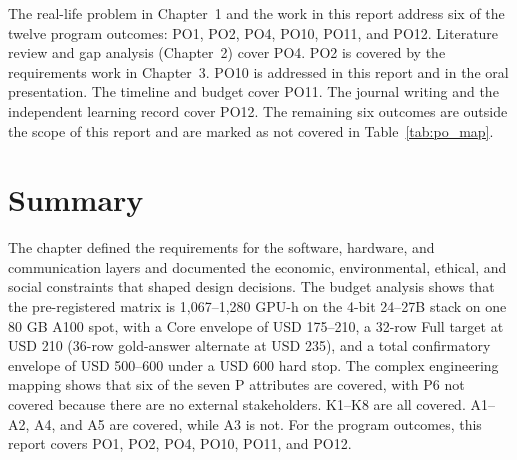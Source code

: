 The real-life problem in Chapter~1 and the work in this report address six of the twelve program outcomes: PO1, PO2, PO4, PO10, PO11, and PO12. Literature review and gap analysis (Chapter~2) cover PO4. PO2 is covered by the requirements work in Chapter~3. PO10 is addressed in this report and in the oral presentation. The timeline and budget cover PO11. The journal writing and the independent learning record cover PO12. The remaining six outcomes are outside the scope of this report and are marked as not covered in Table~\ref{tab:po_map}.

\section{Summary}
The chapter defined the requirements for the software, hardware, and communication layers and documented the economic, environmental, ethical, and social constraints that shaped design decisions. The budget analysis shows that the pre-registered matrix is 1,067--1,280 GPU-h on the 4-bit 24--27B stack on one 80 GB A100 spot, with a Core envelope of USD 175--210, a 32-row Full target at USD 210 (36-row gold-answer alternate at USD 235), and a total confirmatory envelope of USD 500--600 under a USD 600 hard stop. The complex engineering mapping shows that six of the seven P attributes are covered, with P6 not covered because there are no external stakeholders. K1--K8 are all covered. A1--A2, A4, and A5 are covered, while A3 is not. For the program outcomes, this report covers PO1, PO2, PO4, PO10, PO11, and PO12.
